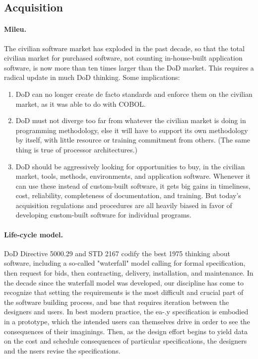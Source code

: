 \documentclass[12pt]{article}
\begin{document}
\subsection*{Acquisition}

\paragraph{Mileu.} The civilian software market has exploded in the past decade, so that the total
civilian market for purchased software, not counting in-house-built application software, is
now more than ten times larger than the DoD market. This requires a radical update in
much DoD thinking. Some implications:

\begin{enumerate}
\item DoD can no longer create de facto standards and enforce them on the civilian market,
as it was able to do with COBOL.

\item DoD must not diverge too far from whatever the civilian market is doing in programming methodology, else it will have to support its own methodology by itself, with little
resource or training commitment from others. (The same thing is true of processor
architectures.)

\item DoD should be aggressively looking for opportunities to buy, in the civilian market,
tools, methods, environments, and application software. Whenever it can use these
instead of custom-built software, it gets big gains in timeliness, cost, reliability,
completeness of documentation, and training. But today's acquisition regulations
and procedures are all heavily biased in favor of developing custom-built software
for individual programs.
\end{enumerate}

\paragraph{Life-cycle model.} DoD Directive 5000.29 and STD 2167 codify the best 1975 thinking
about software, including a so-called "waterfall" model calling for formal specification, then
request for bids, then contracting, delivery, installation, and maintenance. In the decade
since the waterfall model was developed, our discipline has come to recognize that setting
the requirements is the most difficult and crucial part of the software building process, and
bne that requires iteration between the designers and users. In best modern practice, the
ea-.y specification is embodied in a prototype, which the intended users can themselves
drive in order to see the consequences of their imaginings. Then, as the design effort
begins to yield data on the cost and schedule consequences of particular specifications, the
designers and the nsers revise the specifications.
\end{document}
